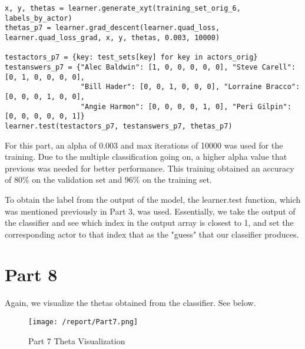 \documentclass[11pt,a4paper]{report}
\begin{document}
\begin{lstlisting}
x, y, thetas = learner.generate_xyt(training_set_orig_6, labels_by_actor)
thetas_p7 = learner.grad_descent(learner.quad_loss, learner.quad_loss_grad, x, y, thetas, 0.003, 10000)

testactors_p7 = {key: test_sets[key] for key in actors_orig}
testanswers_p7 = {"Alec Baldwin": [1, 0, 0, 0, 0, 0], "Steve Carell": [0, 1, 0, 0, 0, 0],
                  "Bill Hader": [0, 0, 1, 0, 0, 0], "Lorraine Bracco": [0, 0, 0, 1, 0, 0],
                  "Angie Harmon": [0, 0, 0, 0, 1, 0], "Peri Gilpin": [0, 0, 0, 0, 0, 1]}
learner.test(testactors_p7, testanswers_p7, thetas_p7)
\end{lstlisting}

For this part, an alpha of 0.003 and max iterations of 10000 was used for the training. Due to the multiple classification going on, a higher alpha value that previous was needed for better performance. This training obtained an accuracy of 80\% on the validation set and 96\% on the training set.

To obtain the label from the output of the model, the learner.test function, which was mentioned previously in Part 3, was used. Essentially, we take the output of the classifier and see which index in the output array is closest to 1, and set the corresponding actor to that index that as the "guess" that our classifier produces.

\newpage
\section*{Part 8}
Again, we visualize the thetas obtained from the classifier. See below.
\begin{figure}[h]
\centering
\texttt{[image: /report/Part7.png]}
\caption{Part 7 Theta Visualization}
\end{figure}
\end{document}
